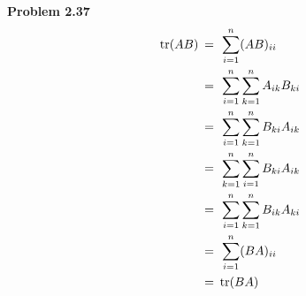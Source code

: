 \documentclass[fleqn]{article}
\newcommand{\problem}[1]{\large\textbf{Problem #1}\normalsize}
\newcommand{\relation}[1]{\ensuremath{\hspace{0.2em} {{} #1 {}} \hspace{0.2em}}}
\newcommand{\equal}{\relation{=}}
\begin{document}
\problem{2.37}
\begin{align*}
  \displaystyle
  \text{tr}(AB)
  & \equal \sum_{i=1}^{n} (AB)_{ii} \\
  {} & \equal \sum_{i=1}^{n} \sum_{k=1}^{n} A_{ik}B_{ki} \\
  {} & \equal \sum_{i=1}^{n} \sum_{k=1}^{n} B_{ki}A_{ik} \\
  {} & \equal \sum_{k=1}^{n} \sum_{i=1}^{n} B_{ki}A_{ik} \\
  {} & \equal \sum_{i=1}^{n} \sum_{k=1}^{n} B_{ik}A_{ki} \\
  {} & \equal \sum_{i=1}^{n} (BA)_{ii} \\
  {} & \equal \text{tr}(BA)
\end{align*}
\end{document}
